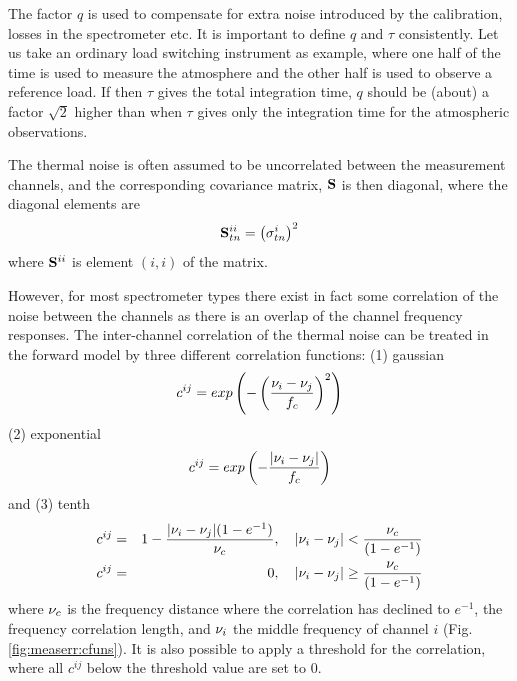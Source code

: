  The factor $q$ is used to compensate for extra noise introduced by
 the calibration, losses in the spectrometer etc. It is important to
 define $q$ and $\tau$ consistently. Let us take an ordinary load
 switching instrument as example, where one half of the time is used
 to measure the atmosphere and the other half is used to observe a
 reference load. If then $\tau$ gives the total integration time, $q$
 should be (about) a factor $\sqrt{2}$ higher than when $\tau$ gives
 only the integration time for the atmospheric observations.

 The thermal noise is often assumed to be uncorrelated between the
 measurement channels, and the corresponding covariance matrix,
 $\mathbf{S}$ is then diagonal, where the diagonal elements are
 \begin{equation}
   \mathbf{S}_{tn}^{ii} = \left( \sigma_{tn}^i \right)^2
  \label{eq:measerr:Stn_diag}
 \end{equation}
 where $\mathbf{S}^{ii}$ is element $(i,i)$ of the matrix.
 
 However, for most spectrometer types there exist in fact some
 correlation of the noise between the channels as there is an overlap
 of the channel frequency responses.  The inter-channel correlation of
 the thermal noise can be treated in the forward model by three
 different correlation functions: (1) gaussian
 \begin{equation}
  c^{ij} = exp\left(-\left(\frac{\nu_i-\nu_j}{f_c}\right)^2\right)
 \end{equation}
 (2) exponential
 \begin{equation}
  c^{ij} = exp\left(-\frac{|\nu_i-\nu_j|}{f_c}\right)
 \end{equation}
 and (3) tenth
 \begin{eqnarray}
  c^{ij} &=& 1-\frac{|\nu_i-\nu_j|(1-e^{-1})}{\nu_c}, \quad 
            |\nu_i-\nu_j| < \frac{\nu_c}{(1-e^{-1})} \nonumber \\
  c^{ij} &=& 0, \quad |\nu_i-\nu_j| \geq \frac{\nu_c}{(1-e^{-1})}
 \end{eqnarray}
 where $\nu_c$ is the frequency distance where the correlation has
 declined to $e^{-1}$, the frequency correlation length, and $\nu_i$
 the middle frequency of channel $i$ (Fig. \ref{fig:measerr:cfuns}).
 It is also possible to apply a threshold for the correlation, where
 all $c^{ij}$ below the threshold value are set to 0.

